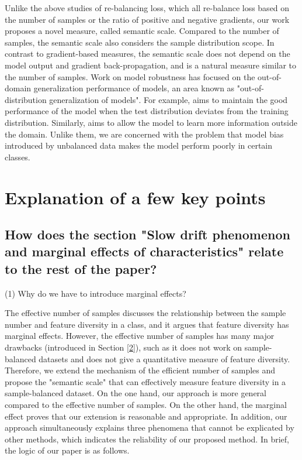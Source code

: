 \documentclass[10pt]{article} %
\begin{document}
Unlike the above studies of re-balancing loss, which all re-balance loss based on the number of samples or the ratio of positive and negative gradients, our work proposes a novel measure, called semantic scale. Compared to the number of samples, the semantic scale also considers the sample distribution scope. In contrast to gradient-based measures, the semantic scale does not depend on the model output and gradient back-propagation, and is a natural measure similar to the number of samples. Work on model robustness has focused on the out-of-domain generalization performance of models, an area known as "out-of-distribution generalization of models". For example, \cite {paper107} aims to maintain the good performance of the model when the test distribution deviates from the training distribution. Similarly, \cite {paper108} aims to allow the model to learn more information outside the domain. Unlike them, we are concerned with the problem that model bias introduced by unbalanced data makes the model perform poorly in certain classes.

\section{Explanation of a few key points\label{Explanation of a few key points of this paper}}

\subsection{How does the section "Slow drift phenomenon and marginal effects of characteristics" relate to the rest of the paper?}

(1) Why do we have to introduce marginal effects?

The effective number of samples discusses the relationship between the sample number and feature diversity in a class, and it argues that feature diversity has marginal effects. However, the effective number of samples has many major drawbacks (introduced in Section \ref{2}), such as it does not work on sample-balanced datasets and does not give a quantitative measure of feature diversity. Therefore, we extend the mechanism of the efficient number of samples and propose the "semantic scale" that can effectively measure feature diversity in a sample-balanced dataset. On the one hand, our approach is more general compared to the effective number of samples. On the other hand, the marginal effect proves that our extension is reasonable and appropriate. In addition, our approach simultaneously explains three phenomena that cannot be explicated by other methods, which indicates the reliability of our proposed method. In brief, the logic of our paper is as follows.
\end{document}

